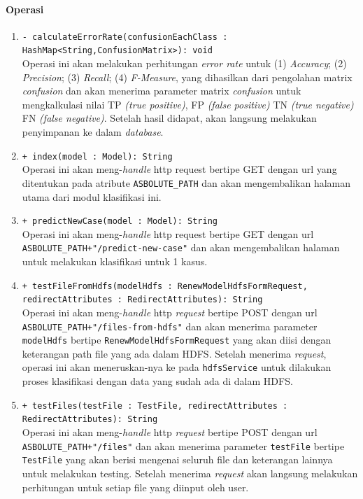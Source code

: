 \begin{enumerate}
	\paragraph{Operasi}
		\begin{enumerate}
			\item \texttt{- calculateErrorRate(confusionEachClass : HashMap<String,ConfusionMatrix>): void}\\
			Operasi ini akan melakukan perhitungan \textit{error rate} untuk (1) \textit{Accuracy}; (2) \textit{Precision}; (3) \textit{Recall}; (4) \textit{F-Measure}, yang dihasilkan dari pengolahan matrix \textit{confusion} dan akan menerima parameter matrix \textit{confusion} untuk mengkalkulasi nilai TP \textit{(true positive)}, FP \textit{(false positive)} TN \textit{(true negative)} FN \textit{(false negative)}. Setelah hasil didapat,  akan langsung melakukan penyimpanan ke dalam \textit{database}.
			
			\item \texttt{+ index(model : Model): String}\\
			Operasi ini akan meng-\textit{handle} http request bertipe GET dengan url yang ditentukan pada atribute \verb|ASBOLUTE_PATH| dan akan mengembalikan halaman utama dari modul klasifikasi ini.

			\item \texttt{+ predictNewCase(model : Model): String}\\
			Operasi ini akan meng-\textit{handle} http request bertipe GET dengan url \verb|ASBOLUTE_PATH+"/predict-new-case"| dan akan mengembalikan halaman untuk melakukan klasifikasi untuk 1 kasus.

			\item \texttt{+ testFileFromHdfs(modelHdfs : RenewModelHdfsFormRequest, redirectAttributes : RedirectAttributes): String}\\
			Operasi ini akan meng-\textit{handle} http \textit{request} bertipe POST dengan url \verb|ASBOLUTE_PATH+"/files-from-hdfs"| dan akan menerima parameter \texttt{modelHdfs} bertipe \texttt{RenewModelHdfsFormRequest} yang akan diisi dengan keterangan path file yang ada dalam HDFS. Setelah menerima \textit{request}, operasi ini akan meneruskan-nya ke pada \texttt{hdfsService} untuk dilakukan proses klasifikasi dengan data yang sudah ada di dalam HDFS. 

			\item \texttt{+ testFiles(testFile : TestFile, redirectAttributes : RedirectAttributes): String}\\
			Operasi ini akan meng-\textit{handle} http \textit{request} bertipe POST dengan url \verb|ASBOLUTE_PATH+"/files"| dan akan menerima parameter \texttt{testFile} bertipe \texttt{TestFile} yang akan berisi mengenai seluruh file dan keterangan lainnya untuk melakukan testing. Setelah menerima \textit{request} akan langsung melakukan perhitungan untuk setiap file yang diinput oleh user. 



\end{enumerate}
\end{enumerate}
